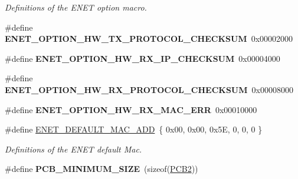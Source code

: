 \begin{DoxyCompactItemize}
\begin{DoxyCompactList}\small\item\em Definitions of the E\+N\+ET option macro. \end{DoxyCompactList}\item 
\#define {\bfseries E\+N\+E\+T\+\_\+\+O\+P\+T\+I\+O\+N\+\_\+\+H\+W\+\_\+\+T\+X\+\_\+\+P\+R\+O\+T\+O\+C\+O\+L\+\_\+\+C\+H\+E\+C\+K\+S\+UM}~0x00002000\hypertarget{group__enet__rtcs__adaptor_ga443ceeeb1a3fff5e491af19c82943536}{}\label{group__enet__rtcs__adaptor_ga443ceeeb1a3fff5e491af19c82943536}

\item 
\#define {\bfseries E\+N\+E\+T\+\_\+\+O\+P\+T\+I\+O\+N\+\_\+\+H\+W\+\_\+\+R\+X\+\_\+\+I\+P\+\_\+\+C\+H\+E\+C\+K\+S\+UM}~0x00004000\hypertarget{group__enet__rtcs__adaptor_ga2d9f7ae2c4a769a27779bc2937f3aaa3}{}\label{group__enet__rtcs__adaptor_ga2d9f7ae2c4a769a27779bc2937f3aaa3}

\item 
\#define {\bfseries E\+N\+E\+T\+\_\+\+O\+P\+T\+I\+O\+N\+\_\+\+H\+W\+\_\+\+R\+X\+\_\+\+P\+R\+O\+T\+O\+C\+O\+L\+\_\+\+C\+H\+E\+C\+K\+S\+UM}~0x00008000\hypertarget{group__enet__rtcs__adaptor_ga423bd47ec2beb57257ea5963585c9386}{}\label{group__enet__rtcs__adaptor_ga423bd47ec2beb57257ea5963585c9386}

\item 
\#define {\bfseries E\+N\+E\+T\+\_\+\+O\+P\+T\+I\+O\+N\+\_\+\+H\+W\+\_\+\+R\+X\+\_\+\+M\+A\+C\+\_\+\+E\+RR}~0x00010000\hypertarget{group__enet__rtcs__adaptor_gafd22f4be799761fe62fac8034736d081}{}\label{group__enet__rtcs__adaptor_gafd22f4be799761fe62fac8034736d081}

\item 
\#define \hyperlink{group__enet__rtcs__adaptor_ga55a31327d055c2a05d2db4c6346561ed}{E\+N\+E\+T\+\_\+\+D\+E\+F\+A\+U\+L\+T\+\_\+\+M\+A\+C\+\_\+\+A\+DD}~\{ 0x00, 0x00, 0x5\+E, 0, 0, 0 \}\hypertarget{group__enet__rtcs__adaptor_ga55a31327d055c2a05d2db4c6346561ed}{}\label{group__enet__rtcs__adaptor_ga55a31327d055c2a05d2db4c6346561ed}

\begin{DoxyCompactList}\small\item\em Definitions of the E\+N\+ET default Mac. \end{DoxyCompactList}\item 
\#define {\bfseries P\+C\+B\+\_\+\+M\+I\+N\+I\+M\+U\+M\+\_\+\+S\+I\+ZE}~(sizeof(\hyperlink{group__enet__rtcs__adaptor_ga81e792bba9b8bca2f6222b1bf9119707}{P\+C\+B2}))\hypertarget{group__enet__rtcs__adaptor_ga996a08564b9abcc11ec188314fa0f4f2}{}\label{group__enet__rtcs__adaptor_ga996a08564b9abcc11ec188314fa0f4f2}


\end{DoxyCompactItemize}

